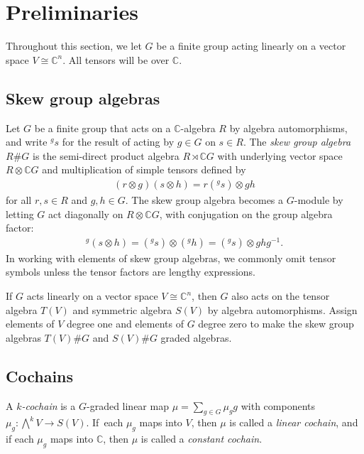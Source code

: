 \documentclass[10pt,a4paper]{amsart}
\numberwithin{equation}{section}
\newcommand{\standout}[1]{\textit{#1}} %
\newcommand{\actby}[1]{{}^{#1}}
\begin{document}
\section{Preliminaries}\label{Preliminaries}
Throughout this section, we let $G$ be a finite group acting linearly on a vector space $V\cong\mathbb{C}^n$. All tensors will be over $\mathbb{C}$.

\subsection{Skew group algebras}
Let $G$ be a finite group that acts on a $\mathbb{C}$-algebra $R$ by
algebra automorphisms, and write $\actby{g}s$ for the result of acting by $g\in G$ on $s\in R$. The \standout{skew group algebra} $R\#G$ is the
semi-direct product algebra $R\rtimes \mathbb{C} G$ with underlying vector space $R\otimes \mathbb{C} G$ and multiplication of simple tensors defined by
\begin{gather*}
(r\otimes g)(s\otimes h)=r(\actby{g}s)\otimes gh
\end{gather*}
for all $r,s\in R$ and $g,h\in G$.
The skew group algebra becomes a $G$-module by letting $G$ act diagonally on
$R\otimes \mathbb{C} G$, with conjugation on the group algebra factor:
\begin{gather*}
\actby{g}(s\otimes h)=(\actby{g}s)\otimes(\actby{g}h)=(\actby{g}s)\otimes ghg^{-1}.
\end{gather*}
In working with elements of skew group algebras, we commonly omit tensor symbols unless
the tensor factors are lengthy expressions.

If $G$ acts linearly on
a vector space $V\cong\mathbb{C}^n$, then $G$ also acts on the tensor algebra $T(V)$ and
symmetric algebra $S(V)$ by algebra automorphisms.
Assign elements of $V$ degree one and elements of $G$ degree zero
to make the skew group algebras $T(V)\# G$ and $S(V)\# G$ graded algebras.

\subsection{Cochains}%

A \standout{$k$-cochain} is a $G$-graded linear map $\mu=\sum_{g\in G}\mu_g g$ with components $\mu_g\colon \bigwedge^k V\to S(V)$. If~each $\mu_g$ maps into $V$, then $\mu$ is called a
\standout{linear cochain}, and if each $\mu_g$ maps into $\mathbb{C}$, then $\mu$ is called
a \standout{constant cochain}.
\end{document}
